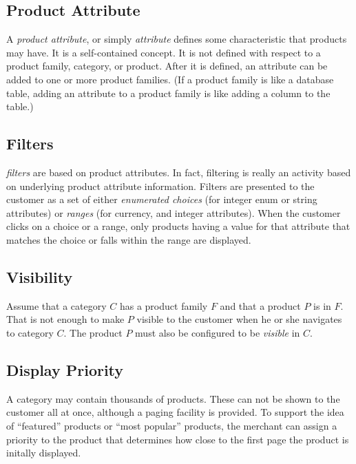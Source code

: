 \documentclass[letterpaper, 12pt]{article}
\begin{document}
\subsection{Product Attribute}
A \textit{product attribute}, or simply \textit{attribute} defines some characteristic that products may have.   It is a self-contained concept.  It is not defined with respect to a product family, category, or product.  After it is defined, an attribute can be added to one or more product families.  (If a product family is like a database table, adding an attribute to a product family is like adding a column to the table.)

\subsection{Filters}
\textit{filters} are based on product attributes.  In fact, filtering is really an activity based on underlying product attribute information.  Filters are presented to the customer as a set of either \textit{enumerated choices} (for integer enum or string attributes) or \textit{ranges} (for currency, and integer attributes).  When the customer clicks on a choice or a range, only products having a value for that attribute that matches the choice or falls within the range are displayed.

\subsection{Visibility}
Assume that a category $C$ has a product family $F$ and that a product $P$ is in $F$.  That is not enough to make $P$ visible to the customer when he or she navigates to category $C$.  The product $P$ must also be configured to be {\em visible} in $C$.

\subsection{Display Priority}
A category may contain thousands of products.  These can not be shown to the customer all at once, although a paging facility is provided.  To support the idea of ``featured'' products or ``most popular'' products, the merchant can assign a priority to the product that determines how close to the first page the product is initally displayed.
\end{document}
